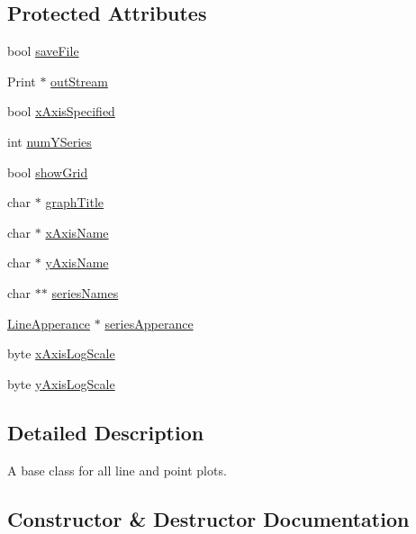 \subsection*{Protected Attributes}
\begin{DoxyCompactItemize}
\item 
bool \hyperlink{class_serial_graph_a24202e0a7a8bac5ec1cfd92bf796e078}{save\+File}
\item 
Print $\ast$ \hyperlink{class_serial_graph_aec32289a9393e98bf80d44406e5c207d}{out\+Stream}
\item 
bool \hyperlink{class_serial_graph_a4dbd9cf190c591fb4f2f46a50d937199}{x\+Axis\+Specified}
\item 
int \hyperlink{class_serial_graph_ab40c430e06102b9624736173d4a58596}{num\+Y\+Series}
\item 
bool \hyperlink{class_serial_graph_ad61d5ea29eacc1611c5addc94714f1e2}{show\+Grid}
\item 
char $\ast$ \hyperlink{class_serial_graph_a0b33d43c2bb54340ef1f90b5f76d7aea}{graph\+Title}
\item 
char $\ast$ \hyperlink{class_serial_graph_a5f5bf85ed361ff567d0888eaa73e269c}{x\+Axis\+Name}
\item 
char $\ast$ \hyperlink{class_serial_graph_a08452a56c74ec5f5473b64605d555339}{y\+Axis\+Name}
\item 
char $\ast$$\ast$ \hyperlink{class_serial_graph_a2307e40e27249f44bbe14776dc68c561}{series\+Names}
\item 
\hyperlink{struct_line_apperance}{Line\+Apperance} $\ast$ \hyperlink{class_serial_graph_a8d743f9eeeca69a988d2159a405e4253}{series\+Apperance}
\item 
byte \hyperlink{class_serial_graph_afc2ca72fdfe2bc5e3159c9e910a8f81e}{x\+Axis\+Log\+Scale}
\item 
byte \hyperlink{class_serial_graph_a1f0424857ec14c176747b3ddb0768eee}{y\+Axis\+Log\+Scale}
\end{DoxyCompactItemize}


\subsection{Detailed Description}
A base class for all line and point plots. 

\subsection{Constructor \& Destructor Documentation}
\hypertarget{class_g_n_u_plot_x_y_graph_base_a68eed7c5855590fd3b2e696948f071f0}{}

